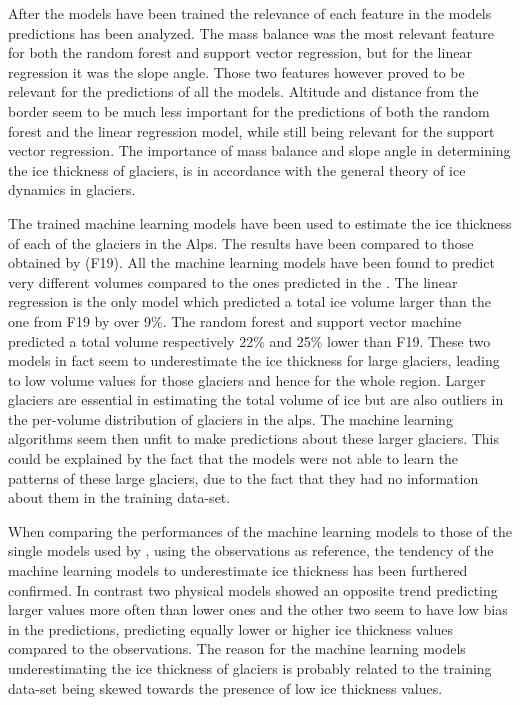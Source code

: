 After the models have been trained the relevance of each feature in the models predictions has been analyzed. The mass balance was the most relevant feature for both the random forest and support vector regression, but for the linear regression it was the slope angle. Those two features however proved to be relevant for the predictions of all the models. Altitude and distance from the border seem to be much less important for the predictions of both the random forest and the linear regression model, while still being relevant for the support vector regression. The importance of mass balance and slope angle in determining the ice thickness of glaciers, is in accordance with the general theory of ice dynamics in glaciers.  

The trained machine learning models have been used to estimate the ice thickness of each of the glaciers in the Alps. The results have been compared to those obtained by \citet{Farinotti2019} (F19). All the machine learning models have been found to predict very different volumes compared to the ones predicted in the \citet{Farinotti2019}. The linear regression is the only model which predicted a total ice volume larger than the one from F19 by over 9\%. The random forest and support vector machine predicted a total volume respectively 22\% and 25\% lower than F19. These two models in fact seem to underestimate the ice thickness for large glaciers, leading to low volume values for those glaciers and hence for the whole region. Larger glaciers are essential in estimating the total volume of ice but are also outliers in the per-volume distribution of glaciers in the alps. The machine learning algorithms seem then unfit to make predictions about these larger glaciers. This could be explained by the fact that the models were not able to learn the patterns of these large glaciers, due to the fact that they had no information about them in the training data-set. 

When comparing the performances of the machine learning models to those of the single models used by \citet{Farinotti2019}, using the observations as reference, the tendency of the machine learning models to underestimate ice thickness has been furthered confirmed. In contrast two physical models showed an opposite trend predicting larger values more often than lower ones and the other two seem to have low bias in the predictions, predicting equally lower or higher ice thickness values compared to the observations. The reason for the machine learning models underestimating the ice thickness of glaciers is probably related to the training data-set being skewed towards the presence of low ice thickness values. 

